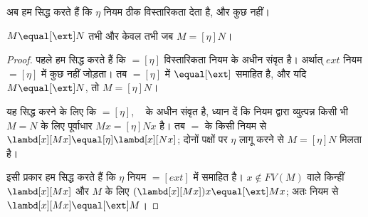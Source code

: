 \documentclass[../../../include/open-logic-section]{subfiles}
\begin{document}
अब हम सिद्ध करते हैं कि $\eta$ नियम ठीक विस्तारिकता देता है, और कुछ नहीं।

\begin{thm}
  $M \equal[\ext] N$ तभी और केवल तभी जब $M \equal[\eta] N$।
\end{thm}

\begin{proof}
  पहले हम सिद्ध करते हैं कि $\equal[\eta]$ विस्तारिकता नियम के अधीन संवृत
  है। अर्थात् $ext$ नियम $\equal[\eta]$ में कुछ नहीं जोड़ता। तब
  $\equal[\eta]$ में $\equal[\ext]$ समाहित है, और यदि $M \equal[\ext] N$,
  तो $M \equal[\eta] N$।

  यह सिद्ध करने के लिए कि $\equal[\eta]$, ~\ext{} के अधीन संवृत है, ध्यान
  दें कि \ext{} नियम द्वारा व्युत्पन्न किसी भी $M \equal N$ के लिए
  पूर्वाधार $Mx \equal[\eta] Nx$ है। तब $\equal$ के किसी नियम से
  $\lambd[x][Mx] \equal[\eta] \lambd[x][Nx]$; दोनों पक्षों पर $\eta$ लागू
  करने से $M \equal[\eta] N$ मिलता है।

  इसी प्रकार हम सिद्ध करते हैं कि $\eta$ नियम $\equal[ext]$ में समाहित है।
  $x \notin FV(M)$ वाले किन्हीं $\lambd[x][Mx]$ और $M$ के लिए
  $(\lambd[x][Mx])x \equal[\ext] Mx$; अतः \ext{} नियम से
  $\lambd[x][Mx] \equal[\ext] M$।
\end{proof}
\end{document}
